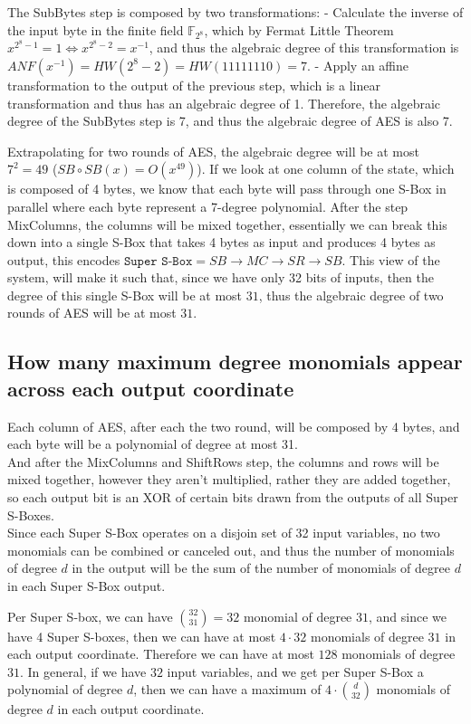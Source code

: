 \documentclass{article}
\begin{document}
The SubBytes step is composed by two transformations:
- Calculate the inverse of the input byte in the finite field $\mathbb{F}_{2^8}$, which by Fermat Little Theorem $x^{2^8 - 1} = 1 \Leftrightarrow x^{2^8 - 2} = x^{-1}$, and thus the algebraic degree of this transformation is $ANF(x^{-1})=HW(2^8 - 2) = HW(11111110) = 7$.
- Apply an affine transformation to the output of the previous step, which is a linear transformation and thus has an algebraic degree of 1.
Therefore, the algebraic degree of the SubBytes step is 7, and thus the algebraic degree of AES is also 7.

Extrapolating for two rounds of AES, the algebraic degree will be at most $7^2 = 49$ ($SB \circ SB(x) = O(x^{49})$).
If we look at one column of the state, which is composed of 4 bytes, we know that each byte will pass through one S-Box in parallel where each byte represent a 7-degree polynomial. After the step MixColumns, the columns will be mixed together, essentially we can break this down into a single S-Box that takes 4 bytes as input and produces 4 bytes as output, this encodes $\texttt{Super S-Box} = SB\rightarrow MC \rightarrow SR \rightarrow SB$.
This view of the system, will make it such that, since we have only 32 bits of inputs, then the degree of this single S-Box will be at most $31$, thus the algebraic degree of two rounds of AES will be at most $31$.

\subsection{How many maximum degree monomials appear across each output coordinate}

Each column of AES, after each the two round, will be composed by 4 bytes, and each byte will be a polynomial of degree at most 31. \\
And after the MixColumns and ShiftRows step, the columns and rows will be mixed together, however they aren't multiplied, rather they are added together, so each output bit is an XOR of certain bits drawn from the outputs of all Super S-Boxes. \\
Since each Super S-Box operates on a disjoin set of 32 input variables, no two monomials can be combined or canceled out, and thus the number of monomials of degree $d$ in the output will be the sum of the number of monomials of degree $d$ in each Super S-Box output.

Per Super S-box, we can have ${32 \choose 31} = 32$ monomial of degree $31$, and since we have 4 Super S-boxes, then we can have at most $4 \cdot 32$ monomials of degree $31$ in each output coordinate.
Therefore we can have at most $128$ monomials of degree $31$.
In general, if we have $32$ input variables, and we get per Super S-Box a polynomial of degree $d$, then we can have a maximum of $4 \cdot {d \choose 32}$ monomials of degree $d$ in each output coordinate.
\end{document}
